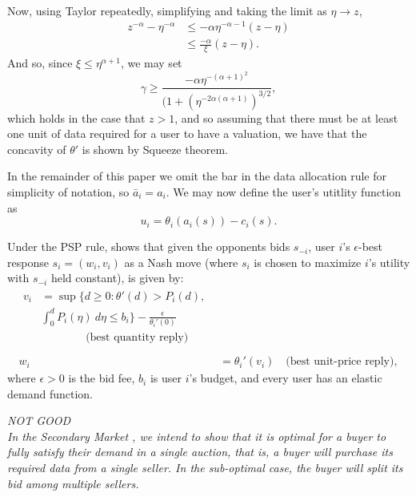 \documentclass[12pt]{article}
\theoremstyle{definition}
\begin{document}
\begin{multicols}{2}
\begin{itemize}
\begin{align*}
\end{align*}
Now, using Taylor repeatedly, simplifying and taking the limit as $\eta \rightarrow z$,
\begin{align*}
    z^{-\alpha} - \eta^{-\alpha} &\le -\alpha\eta^{-\alpha-1}(z-\eta) \\
    & \le \frac{-\alpha}{\xi}(z-\eta).
\end{align*}
And so, since $\xi \le \eta^{\alpha+1}$,
we may set
$$
    \gamma \ge
\frac{-\alpha\eta^{-(\alpha+1)^2}}{\big(1+(\eta^{-2\alpha(\alpha+1)})^{3/2}},
$$
which holds in the case that $z > 1$, and so assuming that there must be at least one
unit of data required for a user to have
a valuation,  we have that the concavity of $\theta'$ is shown by Squeeze theorem.
\end{itemize}

In the remainder of this paper we omit the bar in the data allocation rule for
simplicity of notation, so $\bar{a}_i = a_i$. We may now define the user's utitlity function as
\begin{equation}\label{buyerutility}
    u_i = \theta_i(a_i(s)) - c_i(s).
\end{equation}

Under the PSP rule, \cite{lazar} shows that given the opponents bids $s_{-i}$,
user $i$'s $\epsilon$-best response $s_i = (w_i, v_i)$ as a Nash move
(where $s_i$ is chosen to maximize $i$'s utility with $s_{-i}$ held constant), is
given by:
\begin{align}
\begin{split}
    v_i &= \sup\bigg\lbrace d \ge 0 : \theta '(d) > P_i(d), \\ 
&\displaystyle\int_0^d P_i(\eta) \ d\eta \le b_i\bigg\rbrace -
\frac{\epsilon}{\theta_i'(0)} \\
&\qquad\qquad \text{(best quantity reply)} \\
\end{split}\\
    w_i &= \theta_i'(v_i) \quad \text{(best unit-price reply)},
\end{align}
where $\epsilon > 0$ is the bid fee, $b_i$ is user $i$'s budget, and every user
has an elastic demand function.

\emph{NOT GOOD\\
In the Secondary Market \cite{zheng}, we intend to show that it is optimal for a
buyer to fully satisfy their demand in a single auction, that is, a buyer
will purchase its required data from a single seller. In the sub-optimal case,
the buyer will split its bid among multiple sellers. }


\end{multicols}
\end{document}
